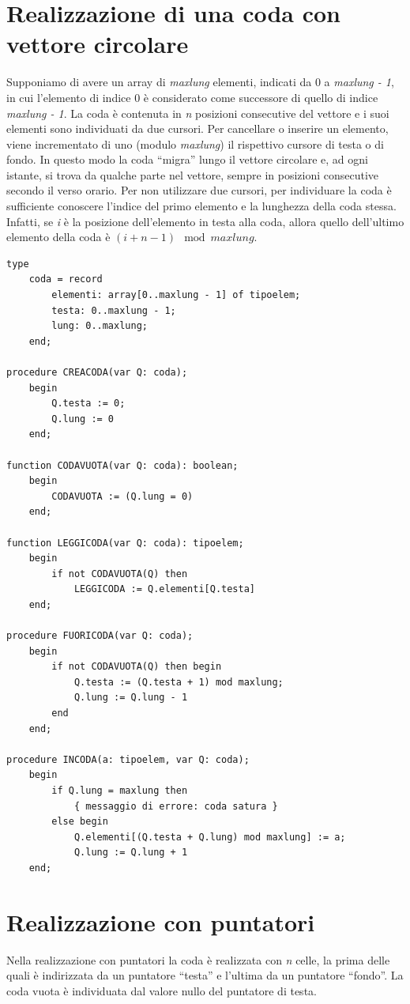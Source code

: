 \documentclass[12pt]{report}
\begin{document}
	\section{Realizzazione di una coda con vettore circolare}
	Supponiamo di avere un array di \textit{maxlung} elementi, indicati da 0 a \textit{maxlung - 1}, in cui l'elemento di indice 0 è considerato come successore di quello di indice \textit{maxlung - 1}. La coda è contenuta in \textit{n} posizioni consecutive del vettore e i suoi elementi sono individuati da due cursori. Per cancellare o inserire un elemento, viene incrementato di uno (modulo \textit{maxlung}) il rispettivo cursore di testa o di fondo. In questo modo la coda ``migra'' lungo il vettore circolare e, ad ogni istante, si trova da qualche parte nel vettore, sempre in posizioni consecutive secondo il verso orario. Per non utilizzare due cursori, per individuare la coda è sufficiente conoscere l'indice del primo elemento e la lunghezza della coda stessa. Infatti, se \textit{i} è la posizione dell'elemento in testa alla coda, allora quello dell'ultimo elemento della coda è $(i + n - 1) \mod{maxlung}$.
	\begin{lstlisting}[style=pascalstyle]
type
	coda = record
		elementi: array[0..maxlung - 1] of tipoelem;
		testa: 0..maxlung - 1;
		lung: 0..maxlung;
	end;

procedure CREACODA(var Q: coda);
	begin
		Q.testa := 0;
		Q.lung := 0
	end;

function CODAVUOTA(var Q: coda): boolean;
	begin
		CODAVUOTA := (Q.lung = 0)
	end;

function LEGGICODA(var Q: coda): tipoelem;
	begin
		if not CODAVUOTA(Q) then
			LEGGICODA := Q.elementi[Q.testa]
	end;

procedure FUORICODA(var Q: coda);
	begin
		if not CODAVUOTA(Q) then begin
			Q.testa := (Q.testa + 1) mod maxlung;
			Q.lung := Q.lung - 1
		end
	end;

procedure INCODA(a: tipoelem, var Q: coda);
	begin
		if Q.lung = maxlung then
			{ messaggio di errore: coda satura }
		else begin
		 	Q.elementi[(Q.testa + Q.lung) mod maxlung] := a;
		 	Q.lung := Q.lung + 1
	end;
\end{lstlisting}
\section{Realizzazione con puntatori}
Nella realizzazione con puntatori la coda è realizzata con \textit{n} celle, la prima delle quali è indirizzata da un puntatore ``testa'' e l'ultima da un puntatore ``fondo''. La coda vuota è individuata dal valore nullo del puntatore di testa.
\end{document}

